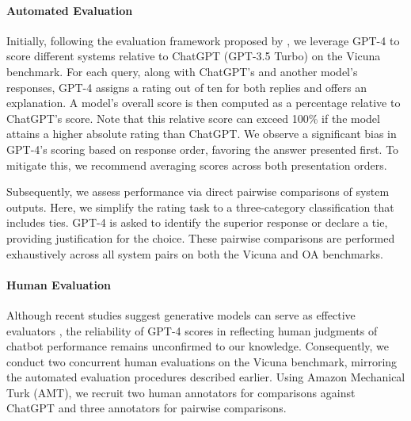 \paragraph{Automated Evaluation} Initially, following the evaluation framework proposed by \citet{vicuna2023}, we leverage GPT-4 to score different systems relative to ChatGPT (GPT-3.5 Turbo) on the Vicuna benchmark. For each query, along with ChatGPT’s and another model’s responses, GPT-4 assigns a rating out of ten for both replies and offers an explanation. A model’s overall score is then computed as a percentage relative to ChatGPT’s score. Note that this relative score can exceed 100\% if the model attains a higher absolute rating than ChatGPT. We observe a significant bias in GPT-4’s scoring based on response order, favoring the answer presented first. To mitigate this, we recommend averaging scores across both presentation orders.

Subsequently, we assess performance via direct pairwise comparisons of system outputs. Here, we simplify the rating task to a three-category classification that includes ties. GPT-4 is asked to identify the superior response or declare a tie, providing justification for the choice. These pairwise comparisons are performed exhaustively across all system pairs on both the Vicuna and OA benchmarks.

\paragraph{Human Evaluation} Although recent studies suggest generative models can serve as effective evaluators \citep{fu2023gptscore}, the reliability of GPT-4 scores in reflecting human judgments of chatbot performance remains unconfirmed to our knowledge. Consequently, we conduct two concurrent human evaluations on the Vicuna benchmark, mirroring the automated evaluation procedures described earlier. Using Amazon Mechanical Turk (AMT), we recruit two human annotators for comparisons against ChatGPT and three annotators for pairwise comparisons.

